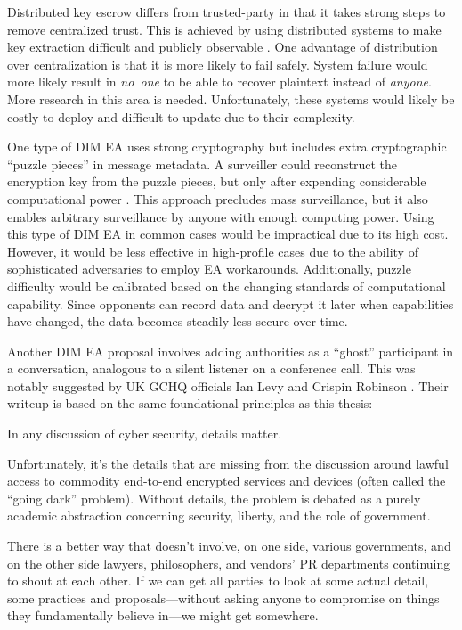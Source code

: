 \documentclass{IEEEtran}
\def\ii#1{\mbox{\textit{#1}}}
\begin{document}
Distributed key escrow differs from trusted-party in that it takes strong steps to remove centralized trust. This is
achieved by using distributed systems to make key extraction difficult and publicly observable \cite{phan_key_2017}
\cite{servan_schreiber_jje_2020}. One advantage of distribution over centralization is that it is more likely to fail
safely. System failure would more likely result in \ii{no one} to be able to recover plaintext instead of \ii{anyone}.
More research in this area is needed. Unfortunately, these systems would likely be costly to deploy and difficult to
update due to their complexity.

One type of \ac{DIM} \ac{EA} uses strong cryptography but includes extra cryptographic ``puzzle pieces'' in message
metadata. A surveiller could reconstruct the encryption key from the puzzle pieces, but only after expending
considerable computational power \cite{bellare_translucent_1996} \cite{wright_crypto_2018}. This approach precludes mass
surveillance, but it also enables arbitrary surveillance by anyone with enough computing power. Using this type of
\ac{DIM} \ac{EA} in common cases would be impractical due to its high cost. However, it would be less effective in
high-profile cases due to the ability of sophisticated adversaries to employ \ac{EA} workarounds. Additionally, puzzle
difficulty would be calibrated based on the changing standards of computational capability. Since opponents can record
data and decrypt it later when capabilities have changed, the data becomes steadily less secure over time.

Another \ac{DIM} \ac{EA} proposal involves adding authorities as a ``ghost'' participant in a conversation, analogous to
a silent listener on a conference call. This was notably suggested by UK \ac{GCHQ} officials Ian Levy and Crispin
Robinson \cite{levy_robinson_2018}. Their writeup is based on the same foundational principles as this thesis:

\begin{displayquote}
In any discussion of cyber security, details matter.

Unfortunately, it's the details that are missing from the discussion around lawful access to commodity end-to-end
encrypted services and devices (often called the ``going dark'' problem). Without details, the problem is debated as a
purely academic abstraction concerning security, liberty, and the role of government.

There is a better way that doesn’t involve, on one side, various governments, and on the other side lawyers,
philosophers, and vendors' PR departments continuing to shout at each other. If we can get all parties to look at some
actual detail, some practices and proposals---without asking anyone to compromise on things they fundamentally believe
in---we might get somewhere.
\cite{levy_robinson_2018}
\end{displayquote}
\end{document}
